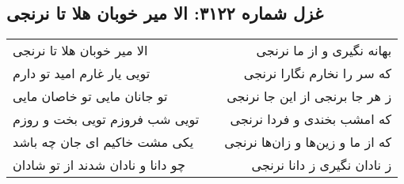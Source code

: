 \begin{center}
\section*{غزل شماره ۳۱۲۲: الا میر خوبان هلا تا نرنجی}
\label{sec:3122}
\begin{longtable}{l p{0.5cm} r}
الا میر خوبان هلا تا نرنجی
&&
بهانه نگیری و از ما نرنجی
\\
تویی یار غارم امید تو دارم
&&
که سر را نخارم نگارا نرنجی
\\
تو جانان مایی تو خاصان مایی
&&
ز هر جا برنجی از این جا نرنجی
\\
تویی شب فروزم تویی بخت و روزم
&&
که امشب بخندی و فردا نرنجی
\\
یکی مشت خاکیم ای جان چه باشد
&&
که از ما و زین‌ها و زان‌ها نرنجی
\\
چو دانا و نادان شدند از تو شادان
&&
ز نادان نگیری ز دانا نرنجی
\\
\end{longtable}
\end{center}
